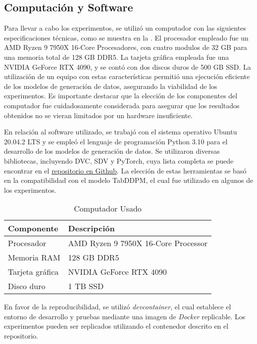 \subsection{Computación y Software}

Para llevar a cabo los experimentos, se utilizó un computador con las siguientes especificaciones técnicas, como se muestra en la . El procesador empleado fue un AMD Ryzen 9 7950X 16-Core Procesadores, con cuatro modulos de 32 GB para una memoria total de 128 GB DDR5. La tarjeta gráfica empleada fue una NVIDIA GeForce RTX 4090, y se contó con dos discos duros de 500 GB SSD. La utilización de un equipo con estas características permitió una ejecución eficiente de los modelos de generación de datos, asegurando la viabilidad de los experimentos. Es importante destacar que la elección de los componentes del computador fue cuidadosamente considerada para asegurar que los resultados obtenidos no se vieran limitados por un hardware insuficiente.

En relación al software utilizado, se trabajó con el sistema operativo Ubuntu 20.04.2 LTS y se empleó el lenguaje de programación Python 3.10 para el desarrollo de los modelos de generación de datos. Se utilizaron diversas bibliotecas, incluyendo DVC, SDV y PyTorch, cuya lista completa se puede encontrar en el \href{https://github.com/gvillarroel/synthetic-data-for-text/blob/main/freeze.txt}{repositorio en Github}. La elección de estas herramientas se basó en la compatibilidad con el modelo TabDDPM, el cual fue utilizado en algunos de los experimentos.

\begin{table}[H]
	\centering
	\caption{Computador Usado}
	\label{tabla-componentes-pc}
    \begin{tabular}{|l|l|}
        \hline
        \rowcolor[gray]{0.8}
        Componente & Descripción \\
        \hline
        Procesador & AMD Ryzen 9 7950X 16-Core Processor \\
        \hline
        Memoria RAM & 128 GB DDR5 \\
        \hline
        Tarjeta gráfica & NVIDIA GeForce RTX 4090 \\
        \hline
        Disco duro & 1 TB SSD \\
        \hline
      \end{tabular}        
\end{table}  

En favor de la reproducibilidad, se utilizó \textit{devcontainer}, el cual establece el entorno de desarrollo y pruebas mediante una imagen de \textit{Docker} replicable. Los experimentos pueden ser replicados utilizando el contenedor descrito en el repositorio.

